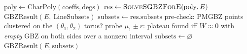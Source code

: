 \begin{algorithm}
\caption{\textsc{SGBZCollectGBZSubsets}$(\mathrm{coeffs},\mathrm{degs},E)$ —
top-level SGBZ entry point with the zero-plateau reclassification.}
\label{alg:sgbz-collect}
\begin{algorithmic}[1]
\State $\mathrm{poly}\gets\mathrm{CharPoly}(\mathrm{coeffs},\mathrm{degs})$
\State $\mathrm{res}\gets\textsc{SolveSGBZForE}(\mathrm{poly},E)$
  \State \Return $\mathrm{GBZResult}(E,\ \mathrm{LineSubsets})$ 
\EndIf
\State $\mathrm{subsets}\gets\mathrm{res}.\mathrm{subsets}$
  \State pre-check: PMGBZ points clustered on the $(\theta_1,\theta_2)$ torus? 
    \State probe $\mu_1\pm r$: plateau found iff $W\approx0$ with \emph{empty} GBZ on both sides over a nonzero interval
     \State $\mathrm{subsets}\gets\varnothing$  \EndIf
  \EndIf
\EndIf
\State \Return $\mathrm{GBZResult}(E,\mathrm{subsets})$ 
\end{algorithmic}
\end{algorithm}


